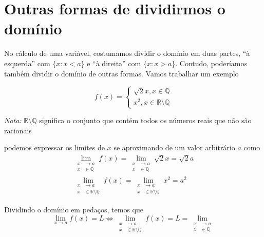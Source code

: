 \documentclass[
  portuguese,
  letterpaper,
  DIV=11,
  numbers=noendperiod]{scrreport}
\begin{document}
\section{Outras formas de dividirmos o
domínio}\label{outras-formas-de-dividirmos-o-domuxednio}

No cálculo de uma variável, costumamos dividir o domínio em duas partes,
``à esquerda'' com \(\{x: x < a\}\) e ``à direita'' com
\(\{x : x > a \}\). Contudo, poderíamos também dividir o domínio de
outras formas. Vamos trabalhar um exemplo

\[
f(x) = \begin{cases}
\sqrt{2}x, x \in \mathbb{Q} \\
x^2, x \in \mathbb{R} \setminus \mathbb{Q}
\end{cases}
\]

\emph{Nota:} \(\mathbb{R} \setminus \mathbb{Q}\) significa o conjunto
que contém todos os números reais que não são racionais

podemos expressar os limites de \(x\) se aproximando de um valor
arbitrário \(a\) como \[
\begin{aligned}
\lim_{\begin{aligned}x&\rightarrow a \\ x& \in\mathbb{Q}\end{aligned}} f(x) =
\lim_{\begin{aligned}x&\rightarrow a \\ x& \in\mathbb{Q}\end{aligned}} \sqrt{2} x=
\sqrt{2} a \\
\lim_{\begin{aligned}x&\rightarrow a \\ x& \in \mathbb{R}\setminus\mathbb{Q}
\end{aligned}} f(x) =
\lim_{\begin{aligned}x&\rightarrow a \\ x& \in\mathbb{R}\setminus\mathbb{Q}
\end{aligned}} x^2 = a^2
\end{aligned}
\]

Dividindo o domínio em pedaços, temos que \[
\lim_{x\rightarrow a} f(x) = L \Leftrightarrow
\lim_{\begin{aligned}x&\rightarrow a \\ x& \in\mathbb{R}\setminus\mathbb{Q}
\end{aligned}} f(x) = L = 
\lim_{\begin{aligned}x&\rightarrow a \\ x& \in\mathbb{Q}\end{aligned}}
\]
\end{document}
